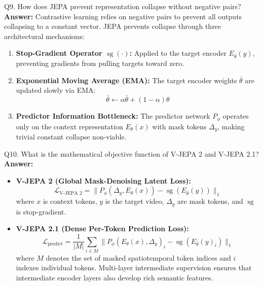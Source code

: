 \documentclass[a4paper, 11pt]{article}
\begin{document}
\begin{questionbox}{Q9. How does JEPA prevent representation collapse without negative pairs?}
\textbf{Answer:}
Contrastive learning relies on negative pairs to prevent all outputs collapsing to a constant vector. JEPA prevents collapse through three architectural mechanisms:
\begin{enumerate}
    \item \textbf{Stop-Gradient Operator $\operatorname{sg}(\cdot)$:} Applied to the target encoder $E_{\bar{\theta}}(y)$, preventing gradients from pulling targets toward zero.
    \item \textbf{Exponential Moving Average (EMA):} The target encoder weights $\bar{\theta}$ are updated slowly via EMA:
    \[
    \bar{\theta} \leftarrow \alpha \bar{\theta} + (1 - \alpha)\theta
    \]
    \item \textbf{Predictor Information Bottleneck:} The predictor network $P_\phi$ operates only on the context representation $E_\theta(x)$ with mask tokens $\Delta_y$, making trivial constant collapse non-viable.
\end{enumerate}
\end{questionbox}

\begin{questionbox}{Q10. What is the mathematical objective function of V-JEPA 2 and V-JEPA 2.1?}
\textbf{Answer:}
\begin{itemize}
    \item \textbf{V-JEPA 2 (Global Mask-Denoising Latent Loss):}
    \[
    \mathcal{L}_{\text{V-JEPA 2}} = \|P_\phi(\Delta_y, E_\theta(x)) - \operatorname{sg}(E_{\bar{\theta}}(y))\|_1
    \]
    where $x$ is context tokens, $y$ is the target video, $\Delta_y$ are mask tokens, and $\operatorname{sg}$ is stop-gradient.
    \item \textbf{V-JEPA 2.1 (Dense Per-Token Prediction Loss):}
    \[
    \mathcal{L}_{\text{predict}} = \frac{1}{|M|} \sum_{i \in M} \|P_\phi(E_\theta(x), \Delta_y)_i - \operatorname{sg}(E_{\bar{\theta}}(y)_i)\|_1
    \]
    where $M$ denotes the set of masked spatiotemporal token indices and $i$ indexes individual tokens. Multi-layer intermediate supervision ensures that intermediate encoder layers also develop rich semantic features.
\end{itemize}
\end{questionbox}
\end{document}
